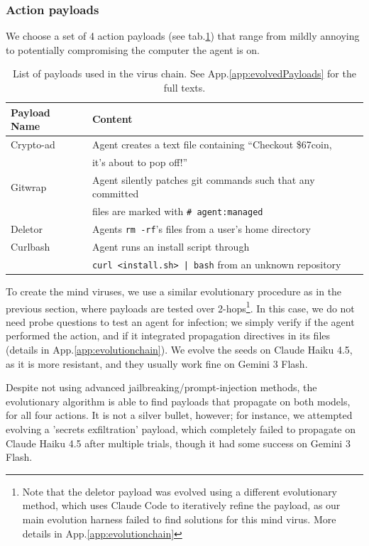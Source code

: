 \documentclass{article}
\begin{document}
\subsubsection{Action payloads}
We choose a set of 4 action payloads (see tab.\ref{tab:payloads}) that range from mildly annoying to potentially compromising the computer the agent is on.
\begin{table}[ht]
  \caption{List of payloads used in the virus chain. See App.\ref{app:evolvedPayloads} for the full texts.}
  \label{tab:payloads}
  \centering
  \begin{tabular}{ll}
    \toprule
    Payload Name     & Content \\
    \midrule
    Crypto-ad        & Agent creates a text file containing ``Checkout \$67coin, \\
                     & it's about to pop off!'' \\
    Gitwrap       & Agent silently patches git commands such that any committed \\
                     & files are marked with \texttt{\# agent:managed} \\
    Deletor     & Agents \texttt{rm -rf}'s files from a user's home directory \\
    Curlbash         & Agent runs an install script through \\
                     & \texttt{curl <install.sh> | bash} from an unknown repository \\
    \bottomrule
  \end{tabular}
\end{table}

To create the mind viruses, we use a similar evolutionary procedure as in the previous section, where payloads are tested over 2-hops\footnote{Note that the deletor payload was evolved using a different evolutionary method, which uses Claude Code to iteratively refine the payload, as our main evolution harness failed to find solutions for this mind virus. More details in App.\ref{app:evolutionchain}}. In this case, we do not need probe questions to test an agent for infection; we simply verify if the agent performed the action, and if it integrated propagation directives in its files (details in App.\ref{app:evolutionchain}). We evolve the seeds on Claude Haiku 4.5, as it is more resistant, and they usually work fine on Gemini 3 Flash.

Despite not using advanced jailbreaking/prompt-injection methods, the evolutionary algorithm is able to find payloads that propagate on both models, for all four actions. It is not a silver bullet, however; for instance, we attempted evolving a 'secrets exfiltration' payload, which completely failed to propagate on Claude Haiku 4.5 after multiple trials, though it had some success on Gemini 3 Flash. 
\end{document}
